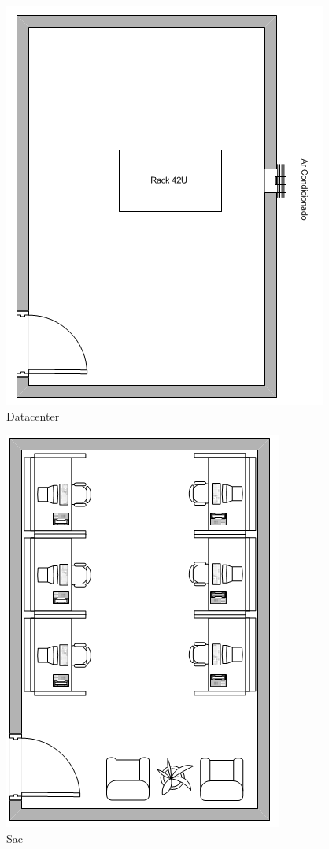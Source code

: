 \documentclass[	DIV=calc,%
							paper=a4,%
							fontsize=12pt,%
							onecolumn]{scrartcl}	 					%
\begin{document}
\begin{figure}
	\centering
	\includegraphics[height=\textwidth,angle=90]{datacenter}
	\caption{Datacenter}
	\label{datacenter}
\end{figure}

\begin{figure}
	\centering
	\includegraphics[height=\textwidth,angle=90]{sac}
	\caption{Sac}
	\label{sac}
\end{figure}
\end{document}
